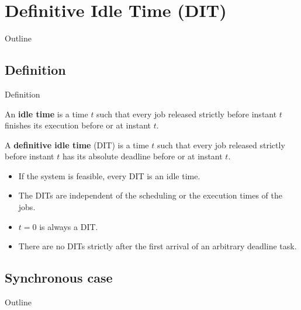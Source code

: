 \documentclass{beamer}
\begin{document}
\section{Definitive Idle Time (DIT)}

\begin{frame}{Outline}
    \tableofcontents[currentsection]
\end{frame}

\subsection{Definition}

\begin{frame}{Definition}
    \begin{definition}
    An \textbf{idle time} is a time $t$ such that every job released strictly before instant $t$ finishes its execution before  or at instant $t$.\\
    \end{definition}

    \begin{definition}
    A \textbf{definitive idle time} (DIT) is a time $t$ such that every job released strictly before instant $t$ has its absolute deadline before or at instant $t$.\\
    \end{definition}

    \begin{itemize}
      \item If the system is feasible, every DIT is an idle time.
      \item The DITs are independent of the scheduling or the execution times of the jobs.
      \item $t=0$ is always a DIT.
      \item There are no DITs strictly after the first arrival of an arbitrary deadline task.
    \end{itemize}
\end{frame}

\subsection{Synchronous case}

\begin{frame}{Outline}
\end{frame}
\end{document}
